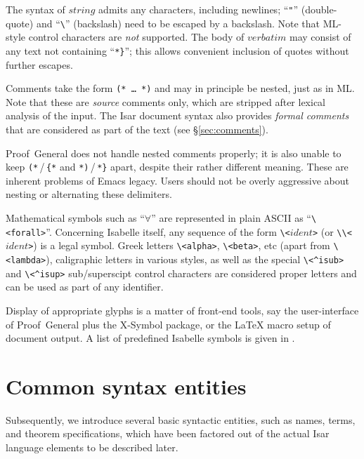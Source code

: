 The syntax of $string$ admits any characters, including newlines; ``\verb|"|''
(double-quote) and ``\verb|\|'' (backslash) need to be escaped by a backslash.
Note that ML-style control characters are \emph{not} supported.  The body of
$verbatim$ may consist of any text not containing ``\verb|*}|''; this allows
convenient inclusion of quotes without further escapes.

Comments take the form \texttt{(*~\dots~*)} and may in principle be nested,
just as in ML.  Note that these are \emph{source} comments only, which are
stripped after lexical analysis of the input.  The Isar document syntax also
provides \emph{formal comments} that are considered as part of the text (see
\S\ref{sec:comments}).

\begin{warn}
  Proof~General does not handle nested comments properly; it is also unable to
  keep \verb,(*,\,/\,\verb,{*, and \verb,*),\,/\,\verb,*}, apart, despite
  their rather different meaning.  These are inherent problems of Emacs
  legacy.  Users should not be overly aggressive about nesting or alternating
  these delimiters.
\end{warn}

\medskip

Mathematical symbols such as ``$\forall$'' are represented in plain ASCII as
``\verb,\<forall>,''.  Concerning Isabelle itself, any sequence of the form
\verb,\<,$ident$\verb,>, (or \verb,\\<,$ident$\verb,>,) is a legal symbol.
Greek letters \verb+\<alpha>+, \verb+\<beta>+, etc (apart from
\verb+\<lambda>+), caligraphic letters in various styles, as
well as the special \verb+\<^isub>+ and \verb+\<^isup>+ sub/superscipt
control characters are considered proper letters and can be used as
part of any identifier. 

Display of appropriate glyphs is a matter of front-end tools, say the
user-interface of Proof~General plus the X-Symbol package, or the {\LaTeX}
macro setup of document output.  A list of predefined Isabelle symbols is
given in \cite[appendix~A]{isabelle-sys}.


\section{Common syntax entities}

Subsequently, we introduce several basic syntactic entities, such as names,
terms, and theorem specifications, which have been factored out of the actual
Isar language elements to be described later.

